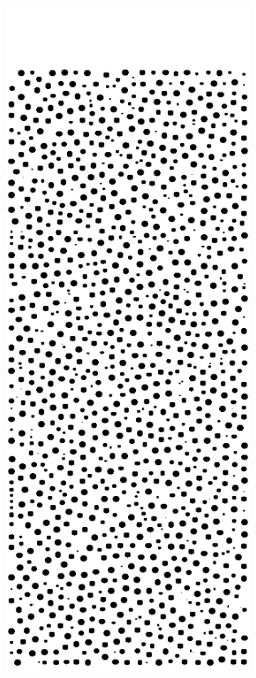 \begin{figure}[h]
        \centering
        \begin{subfigure}[b]{0.2\textwidth}
                \includegraphics[width=\textwidth]{figures/lbm/2d-res20-k050.png}

\end{subfigure}
\end{figure}
